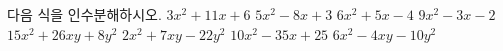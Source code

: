 다음 식을 인수분해하시오.
 $3x^2+11x+6$
 $5x^2-8x+3$
 $6x^2+5x-4$
 $9x^2-3x-2$
 $15x^2+26xy+8y^2$
 $2x^2+7xy-22y^2$
 $10x^2-35x+25$
 $6x^2-4xy-10y^2$
